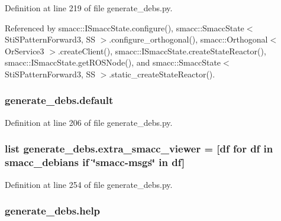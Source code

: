 Definition at line 219 of file generate\+\_\+debs.\+py.



Referenced by smacc\+::\+I\+Smacc\+State.\+configure(), smacc\+::\+Smacc\+State$<$ Sti\+S\+Pattern\+Forward3, S\+S $>$.\+configure\+\_\+orthogonal(), smacc\+::\+Orthogonal$<$ Or\+Service3 $>$.\+create\+Client(), smacc\+::\+I\+Smacc\+State.\+create\+State\+Reactor(), smacc\+::\+I\+Smacc\+State.\+get\+R\+O\+S\+Node(), and smacc\+::\+Smacc\+State$<$ Sti\+S\+Pattern\+Forward3, S\+S $>$.\+static\+\_\+create\+State\+Reactor().

\subsubsection[{\texorpdfstring{default}{default}}]{\setlength{\rightskip}{0pt plus 5cm}generate\+\_\+debs.\+default}\hypertarget{namespacegenerate__debs_a3d67a92b7eb3a59c397dc9fdd1c67558}{}\label{namespacegenerate__debs_a3d67a92b7eb3a59c397dc9fdd1c67558}


Definition at line 206 of file generate\+\_\+debs.\+py.

\subsubsection[{\texorpdfstring{extra\+\_\+smacc\+\_\+viewer}{extra_smacc_viewer}}]{\setlength{\rightskip}{0pt plus 5cm}list generate\+\_\+debs.\+extra\+\_\+smacc\+\_\+viewer = \mbox{[}df for df in {\bf smacc\+\_\+debians} if \char`\"{}smacc-\/msgs\char`\"{} in df\mbox{]}}\hypertarget{namespacegenerate__debs_aae153eaf5f6cddad5899c36fef7e1b10}{}\label{namespacegenerate__debs_aae153eaf5f6cddad5899c36fef7e1b10}


Definition at line 254 of file generate\+\_\+debs.\+py.

\subsubsection[{\texorpdfstring{help}{help}}]{\setlength{\rightskip}{0pt plus 5cm}generate\+\_\+debs.\+help}\hypertarget{namespacegenerate__debs_ab09f4294da5036d5f6881672de9ed9c7}{}\label{namespacegenerate__debs_ab09f4294da5036d5f6881672de9ed9c7}


